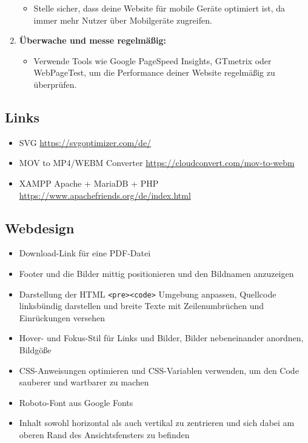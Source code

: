 \documentclass[12pt,a4paper]{scrartcl}
\newcommand{\tightlist}{
  \setlength{\itemsep}{0pt}\setlength{\parskip}{0pt}
}
\begin{document}
\begin{enumerate}
  \begin{itemize}
  \tightlist
  \item
    Stelle sicher, dass deine Website für mobile Geräte optimiert ist,
    da immer mehr Nutzer über Mobilgeräte zugreifen.
  \end{itemize}
\item
  \textbf{Überwache und messe regelmäßig:}

  \begin{itemize}
  \tightlist
  \item
    Verwende Tools wie Google PageSpeed Insights, GTmetrix oder
    WebPageTest, um die Performance deiner Website regelmäßig zu
    überprüfen.
  \end{itemize}
\end{enumerate}

\hypertarget{links}{%
\subsection{Links}\label{links}}

\begin{itemize}
\item
  SVG \url{https://svgoptimizer.com/de/}
\item
  MOV to MP4/WEBM Converter \url{https://cloudconvert.com/mov-to-webm}
\item
  XAMPP Apache + MariaDB + PHP
  \url{https://www.apachefriends.org/de/index.html}
\end{itemize}

\hypertarget{webdesign}{%
\subsection{Webdesign}\label{webdesign}}

\begin{itemize}
\item
  Download-Link für eine PDF-Datei
\item
  Footer und die Bilder mittig positionieren und den Bildnamen
  anzuzeigen
\item
  Darstellung der HTML {\lstinline!<pre><code>!} Umgebung
  anpassen, Quellcode linksbündig darstellen und breite Texte mit
  Zeilenumbrüchen und Einrückungen versehen
\item
  Hover- und Fokus-Stil für Links und Bilder, Bilder nebeneinander
  anordnen, Bildgöße
\item
  CSS-Anweisungen optimieren und CSS-Variablen verwenden, um den Code
  sauberer und wartbarer zu machen
\item
  Roboto-Font aus Google Fonts
\item
  Inhalt sowohl horizontal als auch vertikal zu zentrieren und sich
  dabei am oberen Rand des Ansichtsfensters zu befinden
\end{itemize}
\end{document}
